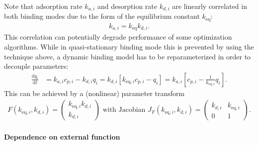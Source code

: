 Note that adsorption rate $k_{a,i}$ and desorption rate $k_{d,i}$ are linearly correlated in both binding modes due to the form of the equilibrium constant $k_{\text{eq}}$:
\begin{align*}
  k_{a,i} = k_{\text{eq}} k_{d,i}.
\end{align*}
This correlation can potentially degrade performance of some optimization algorithms.
While in quasi-stationary binding mode this is prevented by using the technique above, a dynamic binding model has to be reparameterized in order to decouple parameters:
\begin{align*}
  \frac{\mathrm{d} q_i}{\mathrm{d} t} &= k_{a,i} c_{p,i} - k_{d,i} q_i = k_{d,i} \left[ k_{\text{eq},i} c_{p,i} - q_i \right] = k_{a,i} \left[ c_{p,i} - \frac{1}{k_{\text{eq},i}} q_i \right].
\end{align*}
This can be achieved by a (nonlinear) parameter transform
\begin{align*}
  F\left( k_{\text{eq},i}, k_{d,i} \right) = \begin{pmatrix} k_{\text{eq},i} k_{d,i} \\ k_{d,i} \end{pmatrix} \text{ with Jacobian } J_F\left( k_{\text{eq},i}, k_{d,i} \right) = \begin{pmatrix} k_{d,i} & k_{\text{eq},i} \\ 0 & 1 \end{pmatrix}.
\end{align*}

\paragraph{Dependence on external function}
\label{par:MBExternalFunctions}

